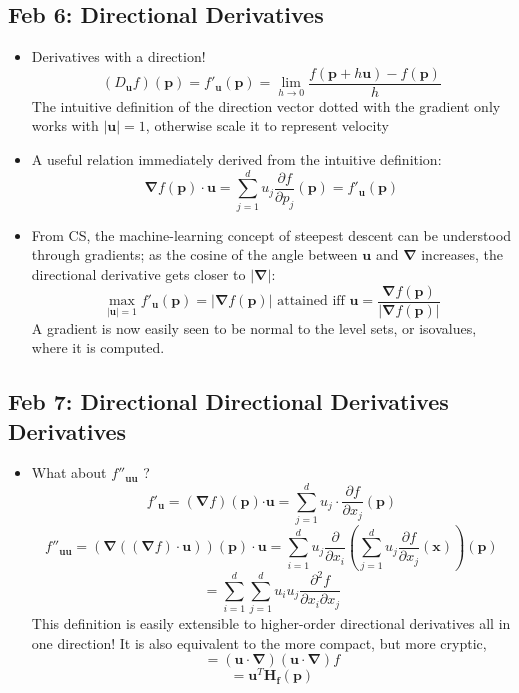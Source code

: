 \documentclass[10pt, oneside]{article}
\newcommand{\del}{\partial}
\newcommand{\Cdot}{\boldsymbol{\cdot}}
\renewcommand{\vec}[1]{\mathbf{#1}}
\newcommand{\mat}[1]{\mathbf{#1}}
\begin{document}
\subsection{Feb 6: Directional Derivatives}
\begin{itemize}
    \item Derivatives with a direction!
        \[(D_\vec{u} f)(\vec{p}) = f'_{\vec{u}}(\vec{p}) = \lim_{h \rightarrow 0} \frac{f(\vec{p} + h\vec{u}) - f(\vec{p})}{h}\]
        The intuitive definition of the direction vector dotted with the gradient only works with $|\vec{u}| = 1$, otherwise scale it to represent velocity
    \item A useful relation immediately derived from the intuitive definition:
        \[\vec{\nabla} f(\vec{p}) \cdot \vec{u} = \sum_{j=1}^d u_j \frac{\del f}{\del p_j} (\vec{p}) = f'_\vec{u} (\vec{p})\]
    \item From CS, the machine-learning concept of steepest descent can be understood through gradients; as the cosine of the angle between $\vec{u}$ and $\vec{\nabla}$ increases, the directional derivative gets closer to $|\vec{\nabla}|$:
        \[\max_{|\vec{u}| = 1} f'_\vec{u} (\vec{p}) = |\vec{\nabla} f (\vec{p})| \text{ attained iff } \vec{u} = \frac{\vec{\nabla} f (\vec{p})}{|\vec{\nabla} f (\vec{p})|}\]
        A gradient is now easily seen to be normal to the level sets, or isovalues, where it is computed.
\end{itemize}

\subsection{Feb 7: Directional Directional Derivatives Derivatives}
\begin{itemize}
    \item What about $f''_{\vec{u}\vec{u}}$ ? 
        \[f'_\vec{u} = (\vec{\nabla} f)(\vec{p}) \Cdot \vec{u} = \sum_{j = 1}^d u_j \cdot \frac{\del f}{\del x_j} (\vec{p})\]
        \[f''_{\vec{u}\vec{u}} = (\vec{\nabla} ((\vec{\nabla} f) \cdot \vec{u}))(\vec{p}) \cdot \vec{u} = \sum_{i = 1}^d u_j \frac{\del}{\del x_i} \left(\sum_{j = 1}^d u_j \frac{\del f}{\del x_j} (\vec{x})\right) (\vec{p})\]
        \[= \sum_{i = 1}^d \sum_{j = 1}^d u_i u_j \frac{\del^2 f}{\del x_i \del x_j}\]
        This definition is easily extensible to higher-order directional derivatives all in one direction! It is also equivalent to the more compact, but more cryptic,
        \[= (\vec{u} \cdot \vec{\nabla})(\vec{u} \cdot \vec{\nabla}) f\]
        \[= \vec{u}^T \mat{H_f} (\vec{p})\]
\end{itemize}
\end{document}
